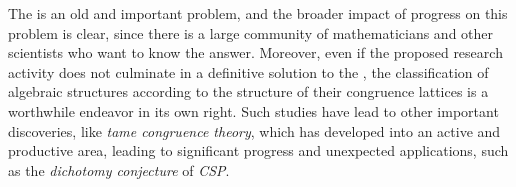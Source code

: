 \vskip2mm
The \flrp is an old and important problem, and the broader impact of
progress on this problem is clear, since there is a large community of
mathematicians and other scientists who want to know the answer.
Moreover, even if the proposed research activity does not culminate in a
definitive solution to the \flrp, the classification of algebraic structures
according to the structure of their congruence lattices is a worthwhile
endeavor in its own right.  Such studies have lead to %
other important discoveries, like \emph{tame congruence theory}, which 
has developed into an active and productive area, leading to
significant progress and unexpected applications, such as the 
\emph{dichotomy conjecture} of \emph{CSP}.

